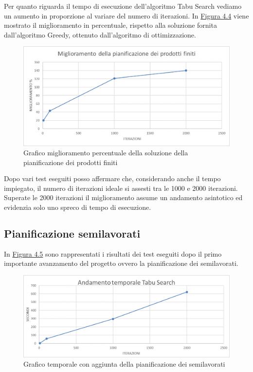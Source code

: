 Per quanto riguarda il tempo di esecuzione dell'algoritmo Tabu Search vediamo un aumento in proporzione al variare del numero di iterazioni.
In \hyperref[4.4]{Figura 4.4} viene mostrato il miglioramento in percentuale, rispetto alla soluzione fornita dall'algoritmo Greedy, ottenuto dall'algoritmo di ottimizzazione.

\begin{figure}[H]
	\includegraphics[width=13cm]{immagini/graficoPF3.png}
	\centering
    \caption{Grafico miglioramento percentuale della soluzione della pianificazione dei prodotti finiti}
    \label{4.4}
\end{figure}

Dopo vari test eseguiti posso affermare che, considerando anche il tempo impiegato, il numero di iterazioni ideale si assesti tra le 1000 e 2000 iterazioni.
Superate le 2000 iterazioni il miglioramento assume un andamento asintotico ed evidenzia solo uno spreco di tempo di esecuzione. 


\subsection{Pianificazione semilavorati}

In \hyperref[4.5]{Figura 4.5} sono rappresentati i risultati dei test eseguiti dopo il primo importante avanzamento del progetto ovvero la pianificazione dei semilavorati.

\begin{figure}[H]
	\includegraphics[width=13cm]{immagini/graficosl2.png}
	\centering
    \caption{Grafico temporale con aggiunta della pianificazione dei semilavorati}
    \label{4.5}
\end{figure}

